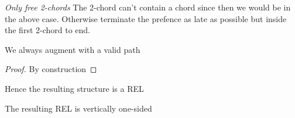       \emph{Only free 2-chords}
      The 2-chord can't contain a chord since then we would be in the above case. Otherwise terminate the prefence as late as possible but inside the first 2-chord to end.

      \begin{lemma}
        We always augment with a valid path
      \end{lemma}
      \begin{proof}
        By construction
      \end{proof}

      Hence the resulting structure is a REL 



      \begin{lemma}
        \label{lm:}
        The resulting REL is vertically one-sided
      \end{lemma}

